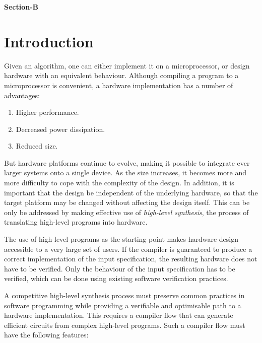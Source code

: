 \documentclass[12pt]{article}
\begin{document}
\newpage

\begin{center}
  \bf \Large Section-B\\
  \vspace{2ex}
\end{center}

\incone
{}

\section{Introduction}

Given an algorithm, one can either implement it on a microprocessor,
or design hardware with an equivalent behaviour. Although compiling a
program to a microprocessor is convenient, a hardware implementation
has a number of advantages:

\begin{enumerate}
  \item Higher performance.
  \item Decreased power dissipation.
  \item Reduced size.
\end{enumerate}

But hardware platforms continue to evolve, making it possible to
integrate ever larger systems onto a single device. As the size
increases, it becomes more and more difficulty to cope with the
complexity of the design. In addition, it is important that the design
be independent of the underlying hardware, so that the target platform
may be changed without affecting the design itself. This can be only
be addressed by making effective use of {\em high-level synthesis},
the process of translating high-level programs into hardware.

The use of high-level programs as the starting point makes hardware
design accessible to a very large set of users. If the compiler is
guaranteed to produce a correct implementation of the input
specification, the resulting hardware does not have to be verified. 
Only the behaviour of the input specification has to be verified,
which can be done using existing software verification practices.

A competitive high-level synthesis process must preserve common
practices in software programming while providing a verifiable and
optimisable path to a hardware implementation. This requires a
compiler flow that can generate efficient circuits from complex
high-level programs. Such a compiler flow must have the following
features:
\end{document}
